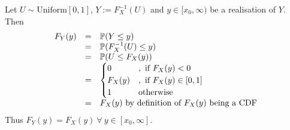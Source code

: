 \documentclass[11pt,a4paper]{article}
\begin{document}
\apart
Let $U\sim\text{Uniform}[0,1]$, $Y:=F_X^{-1}(U)$ and $y\in[x_0,\infty)$ be a realisation of $Y$. Then
\[\begin{array}{rcl}
F_Y(y)&=&\mathbb{P}(Y\leq y)\\
&=&\mathbb{P}(F_X^{-1}(U)\leq y)\\
&=&\mathbb{P}(U\leq F_X(y))\\
&=&\begin{cases}
0&,\ \text{if}\ F_X(y)<0\\
F_X(y)&,\ \text{if}\ F_X(y)\in[0,1]\\
1&\text{otherwise}
\end{cases}\\
&=&F_X(y)\ \text{by definition of $F_X(y)$ being a CDF}
\end{array}\]
Thus $F_Y(y)=F_X(y)\ \forall\ y\in[x_0,\infty]$.
\end{document}
